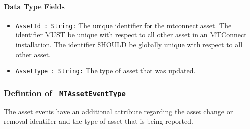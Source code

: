 \FloatBarrier
\paragraph{Data Type Fields}

\begin{itemize}
\item \texttt{AssetId : String:}  The unique identifier for the mtconnect asset. The identifier MUST be unique with respect to all other asset in an MTConnect installation. The identifier SHOULD be globally unique with respect to all other asset.

\item \texttt{AssetType : String:}  The type of asset that was updated.

\end{itemize}
\FloatBarrier
\subsubsection{Defintion of \texttt{ MTAssetEventType}}
  \label{type:MTAssetEventType}

\FloatBarrier

The asset events have an additional attribute regarding the asset change or removal identifier
and the type of asset that is being reported.

